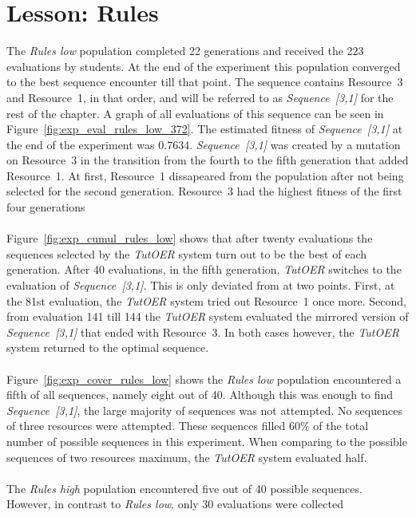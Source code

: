 \section{Lesson: Rules}
\label{sec:results_rules}
The \emph{Rules low} population completed 22 generations and received the
223 evaluations by students. At the end of the experiment
this population converged to the best sequence encounter till that point. The
sequence contains Resource~3 and Resource~1, in that order, and will be
referred to as \emph{Sequence~[3,1]} for the rest of the chapter. A graph of all
evaluations of this sequence can be seen in
Figure~\ref{fig:exp_eval_rules_low_372}.
The estimated fitness of \emph{Sequence~[3,1]} at the end of the experiment was
0.7634. \emph{Sequence~[3,1]} was created by a mutation on Resource~3 in the transition
from the fourth to the fifth generation that added Resource~1. At first,
Resource~1 dissapeared from the population after not being selected for the
second generation. Resource~3 had the highest fitness of the first four
generations \\\\
\noindent
Figure~\ref{fig:exp_cumul_rules_low} shows that after twenty evaluations the
sequences selected by the \emph{TutOER} system turn out to be the best of each
generation. After 40 evaluations, in the fifth generation, \emph{TutOER}
switches to the evaluation of \emph{Sequence~[3,1]}. This is only deviated from at
two points. First, at the 81st evaluation, the \emph{TutOER} system tried out
Resource~1 once more. Second, from evaluation 141 till 144 the \emph{TutOER}
system evaluated the mirrored version of \emph{Sequence~[3,1]} that ended with
Resource~3. In both cases however, the \emph{TutOER} system returned to the
optimal sequence.\\\\
\noindent
Figure~\ref{fig:exp_cover_rules_low} shows the \emph{Rules low} population
encountered a fifth of all sequences, namely eight out of 40. Although this was
enough to find \emph{Sequence~[3,1]}, the large majority of sequences was not
attempted. No sequences of three resources were attempted. These sequences
filled 60\% of the total number of possible sequences in this experiment. When
comparing to the possible sequences of two resources maximum, the \emph{TutOER}
system evaluated half.\\\\
\noindent
The \emph{Rules high} population encountered five out of 40 possible sequences.
However, in contrast to \emph{Rules low}, only 30 evaluations were collected
